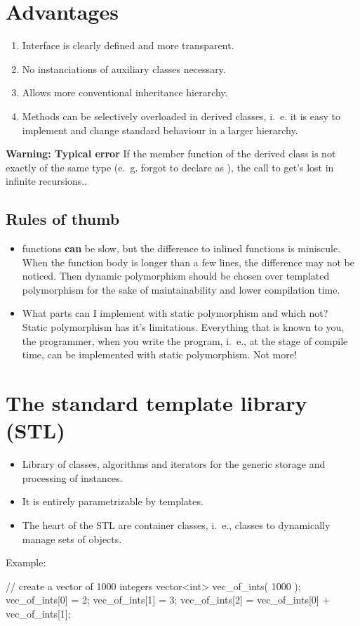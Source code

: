 \section{Advantages}
\begin{enumerate}
\item Interface is clearly defined and more transparent.
\item No instanciations of auxiliary classes necessary.
\item Allows more conventional inheritance hierarchy.
\item Methods can be selectively overloaded in derived classes, i.~e. it is easy to
implement and change standard behaviour in a larger hierarchy.
\end{enumerate}

{\bf Warning: Typical error} If the member function of the derived class is not exactly of the
same type (e.~g. forgot to declare as ), the call to
 get's lost in infinite recursions..


\subsection{Rules of thumb}

\begin{itemize}
\item {} functions {\bf can} be slow, but the difference to inlined functions is miniscule. {When the function body is longer than a few lines, the difference may not be noticed.} Then dynamic polymorphism should be chosen over templated polymorphism for the sake of maintainability and lower compilation time.
\item What parts can I implement with static polymorphism and which not? \\
Static polymorphism has it's limitations. Everything that is known to you, the programmer, when you write the program, i.~e., at the stage of compile time, can be implemented with static polymorphism. Not more!
\end{itemize}


\section{The standard template library (STL)}


\begin{itemize}
\item Library of classes, algorithms and iterators for the generic storage and processing of instances.
\item It is entirely parametrizable by templates.
\item The heart of the STL are container classes, i.~e., classes to dynamically manage sets of objects.
\end{itemize}
Example:
\begin{myverbatim}
// create a vector of 1000 integers
vector<int> vec_of_ints( 1000 );
vec_of_ints[0] = 2;
vec_of_ints[1] = 3;
vec_of_ints[2] = vec_of_ints[0] + vec_of_ints[1];
\end{myverbatim}


